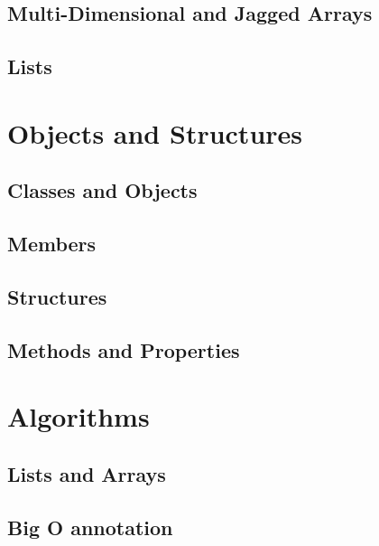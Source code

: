 \documentclass[
]{book}
\begin{document}
\hypertarget{multi-dimensional-and-jagged-arrays}{%
\section{Multi-Dimensional and Jagged Arrays}\label{multi-dimensional-and-jagged-arrays}}

\hypertarget{lists}{%
\section{Lists}\label{lists}}

\hypertarget{objects-and-structures}{%
\chapter{Objects and Structures}\label{objects-and-structures}}

\hypertarget{classes-and-objects}{%
\section{Classes and Objects}\label{classes-and-objects}}

\hypertarget{members}{%
\section{Members}\label{members}}

\hypertarget{structures}{%
\section{Structures}\label{structures}}

\hypertarget{methods-and-properties}{%
\section{Methods and Properties}\label{methods-and-properties}}

\hypertarget{algorithms}{%
\chapter{Algorithms}\label{algorithms}}

\hypertarget{lists-and-arrays}{%
\section{Lists and Arrays}\label{lists-and-arrays}}

\hypertarget{big-o-annotation}{%
\section{Big O annotation}\label{big-o-annotation}}
\end{document}
